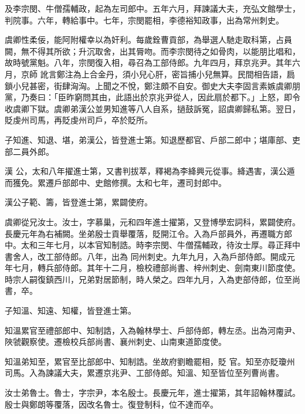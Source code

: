 \begin{pinyinscope}
 及李宗閔、牛僧孺輔政，起為左司郎中。五年六月，拜諫議大夫，充弘文館學士，判院事。六年，轉給事中。七年，宗閔罷相，李德裕知政事，出為常州刺史。



 虞卿性柔佞，能阿附權幸以為奸利。每歲銓曹貢部，為舉選人馳走取科第，占員闕，無不得其所欲；升沉取舍，出其脣吻。而李宗閔待之如骨肉，以能朋比唱和，故時號黨魁。八年，宗閔復入相，尋召為工部侍郎。九年四月，拜京兆尹。其年六月，京師
 訛言鄭注為上合金丹，須小兒心肝，密旨捕小兒無算。民間相告語，扃鎖小兒甚密，街肆洶洶。上聞之不悅，鄭注頗不自安。御史大夫李固言素嫉虞卿朋黨，乃奏曰：「臣昨窮問其由，此語出於京兆尹從人，因此扇於都下。」上怒，即令收虞卿下獄。虞卿弟漢公並男知進等八人自系，撾鼓訴冤，詔虞卿歸私第。翌日，貶虔州司馬，再貶虔州司戶，卒於貶所。



 子知進、知退、堪，弟漢公，皆登進士第。知退歷都官、戶部二郎中；堪庫部、吏部二員外郎。



 漢
 公，太和八年擢進士第，又書判拔萃，釋褐為李絳興元從事。絳遇害，漢公遁而獲免。累遷戶部郎中、史館修撰。太和七年，遷司封郎中。



 漢公子範、籌，皆登進士第，累闢使府。



 虞卿從兄汝士。汝士，字慕巢，元和四年進士擢第，又登博學宏詞科，累闢使府。長慶元年為右補闕。坐弟殷士貢舉覆落，貶開江令。入為戶部員外，再遷職方郎中。太和三年七月，以本官知制誥。時李宗閔、牛僧孺輔政，待汝士厚。尋正拜中書舍人，改工部侍郎。八年，出為
 同州刺史。九年九月，入為戶部侍郎。開成元年七月，轉兵部侍郎。其年十二月，檢校禮部尚書、梓州刺史、劍南東川節度使。時宗人嗣復鎮西川，兄弟對居節制，時人榮之。四年九月，入為吏部侍郎，位至尚書，卒。



 子知溫、知遠、知權，皆登進士第。



 知溫累官至禮部郎中、知制誥，入為翰林學士、戶部侍郎，轉左丞。出為河南尹、陜虢觀察使。遷檢校兵部尚書、襄州刺史、山南東道節度使。



 知溫弟知至，累官至比部郎中、知制誥。坐故府劉瞻罷相，貶
 官。知至亦貶瓊州司馬。入為諫議大夫，累遷京兆尹、工部侍郎。知溫、知至皆位至列曹尚書。



 汝士弟魯士。魯士，字宗尹，本名殷士。長慶元年，進士擢第，其年詔翰林覆試。殷士與鄭朗等覆落，因改名魯士。復登制科，位不達而卒。




\end{pinyinscope}
